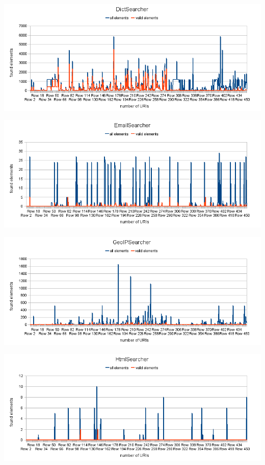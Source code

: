 \documentclass[11pt,a4paper]{article}
\begin{document}
\begin{center}
\includegraphics[width=135mm]{dict.png}


\includegraphics[width=135mm]{email.png}


\includegraphics[width=135mm]{geo.png}


\includegraphics[width=135mm]{html.png}
\end{center}
\end{document}
